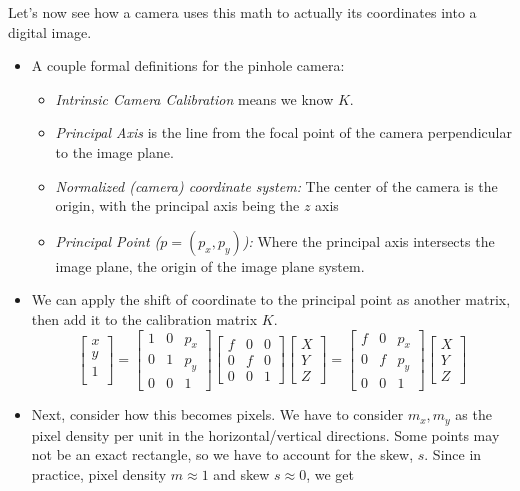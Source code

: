 \documentclass{article}
\begin{document}
Let's now see how a camera uses this math to actually its coordinates into a digital image. 
\begin{itemize}
    \item A couple formal definitions for the pinhole camera:
    \begin{itemize}
        \item \textit{Intrinsic Camera Calibration} means we know $K$.
        \item \textit{Principal Axis} is the line from the focal point of the camera perpendicular to the image plane.
        \item \textit{Normalized (camera) coordinate system:} The center of the camera is the origin, with the principal axis being the $z$ axis
        \item \textit{Principal Point ($p = (p_x,p_y)$):} Where the principal axis intersects the image plane, the origin of the image plane system. 
    \end{itemize}
    \item We can apply the shift of coordinate to the principal point as another matrix, then add it to the calibration matrix $K$.
    $$\begin{bmatrix}
    x\\y\\1\\
    \end{bmatrix} = \begin{bmatrix}
    1&0&p_x\\0&1&p_y\\0&0&1
    \end{bmatrix}\begin{bmatrix}
    f&0&0\\0&f&0\\0&0&1
    \end{bmatrix}\begin{bmatrix}
    X\\Y\\Z
    \end{bmatrix} = \begin{bmatrix}
    f&0&p_x\\0&f&p_y\\0&0&1
    \end{bmatrix}\begin{bmatrix}
    X\\Y\\Z
    \end{bmatrix}$$
    \item Next, consider how this becomes pixels. We have to consider $m_x,m_y$ as the pixel density per unit in the horizontal/vertical directions. Some points may not be an exact rectangle, so we have to account for the skew, $s$. Since in practice, pixel density $m \approx 1$ and skew $s \approx 0$, we get  

\end{itemize}
\end{document}
